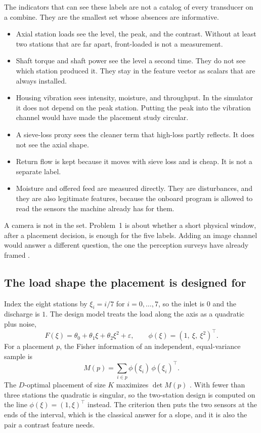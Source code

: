 The indicators that can see these labels are not a catalog of every transducer on a combine. They are the smallest set whose absences are informative.

\begin{itemize}
\item Axial station loads see the level, the peak, and the contrast. Without at least two stations that are far apart, front-loaded is not a measurement.
\item Shaft torque and shaft power see the level a second time. They do not see which station produced it. They stay in the feature vector as scalars that are always installed.
\item Housing vibration sees intensity, moisture, and throughput. In the simulator it does not depend on the peak station. Putting the peak into the vibration channel would have made the placement study circular.
\item A sieve-loss proxy sees the cleaner term that high-loss partly reflects. It does not see the axial shape.
\item Return flow is kept because it moves with sieve loss and is cheap. It is not a separate label.
\item Moisture and offered feed are measured directly. They are disturbances, and they are also legitimate features, because the onboard program is allowed to read the sensors the machine already has for them.
\end{itemize}

A camera is not in the set. Problem~1 is about whether a short physical window, after a placement decision, is enough for the five labels. Adding an image channel would answer a different question, the one the perception surveys have already framed \cite{kamilaris2018,patricio2018}.

\subsection{The load shape the placement is designed for}

Index the eight stations by \(\xi_i=i/7\) for \(i=0,\ldots,7\), so the inlet is \(0\) and the discharge is \(1\). The design model treats the load along the axis as a quadratic plus noise,
\begin{equation}
F(\xi) = \theta_0 + \theta_1 \xi + \theta_2 \xi^2 + \varepsilon,
\qquad
\phi(\xi) = (1,\ \xi,\ \xi^2)^\top .
\label{eq:shape}
\end{equation}
For a placement \(p\), the Fisher information of an independent, equal-variance sample is
\begin{equation}
M(p) = \sum_{i\in p} \phi(\xi_i)\,\phi(\xi_i)^\top .
\label{eq:fisher}
\end{equation}
The \(D\)-optimal placement of size \(K\) maximizes \(\det M(p)\) \cite{atkinson2007}. With fewer than three stations the quadratic is singular, so the two-station design is computed on the line \(\phi(\xi)=(1,\xi)^\top\) instead. The criterion then puts the two sensors at the ends of the interval, which is the classical answer for a slope, and it is also the pair a contrast feature needs.

